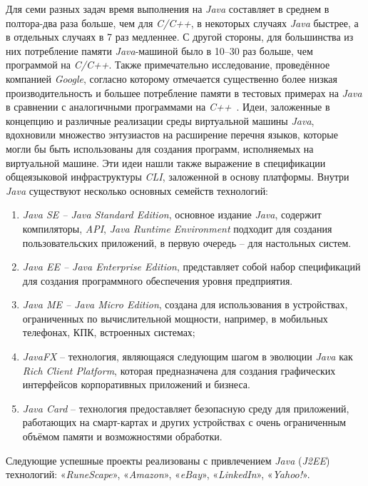 Для семи разных задач время выполнения на \textit{Java} составляет в среднем в полтора-два раза больше, чем для \textit{C/C++}, в некоторых случаях \textit{Java} быстрее, а в отдельных случаях в 7 раз медленнее. С другой стороны, для большинства из них потребление памяти \textit{Java}-машиной было в 10–30 раз больше, чем программой на \textit{C/C++}. Также примечательно исследование, проведённое компанией \textit{Google}, согласно которому отмечается существенно более низкая производительность и большее потребление памяти в тестовых примерах на \textit{Java} в сравнении с аналогичными программами на \textit{C++}~\cite{java}.
Идеи, заложенные в концепцию и различные реализации среды виртуальной машины \textit{Java}, вдохновили множество энтузиастов на расширение перечня языков, которые могли бы быть использованы для создания программ, исполняемых на виртуальной машине. Эти идеи нашли также выражение в спецификации общеязыковой инфраструктуры \textit{CLI}, заложенной в основу платформы. Внутри \textit{Java} существуют несколько основных семейств технологий:

\begin{enumerate}
	\item \textit{Java SE – Java Standard Edition}, основное издание \textit{Java}, содержит компиляторы, \textit{API}, \textit{Java Runtime Environment} подходит для создания пользовательских приложений, в первую очередь – для настольных систем.
	\item \textit{Java EE – Java Enterprise Edition}, представляет собой набор спецификаций для создания программного обеспечения уровня предприятия.
	\item \textit{Java ME – Java Micro Edition}, создана для использования в устройствах, ограниченных по вычислительной мощности, например, в мобильных телефонах, КПК, встроенных системах;
	\item \textit{JavaFX} – технология, являющаяся следующим шагом в эволюции \textit{Java} как \textit{Rich Client Platform}, которая предназначена для создания графических интерфейсов корпоративных приложений и бизнеса.
	\item \textit{Java Card} – технология предоставляет безопасную среду для приложений, работающих на смарт-картах и других устройствах с очень ограниченным объёмом памяти и возможностями обработки.
\end{enumerate}

Следующие успешные проекты реализованы с привлечением \textit{Java} (\textit{J2EE}) технологий: «\textit{RuneScape}», «\textit{Amazon}», «\textit{eBay}», «\textit{LinkedIn}», «\textit{Yahoo!}».

